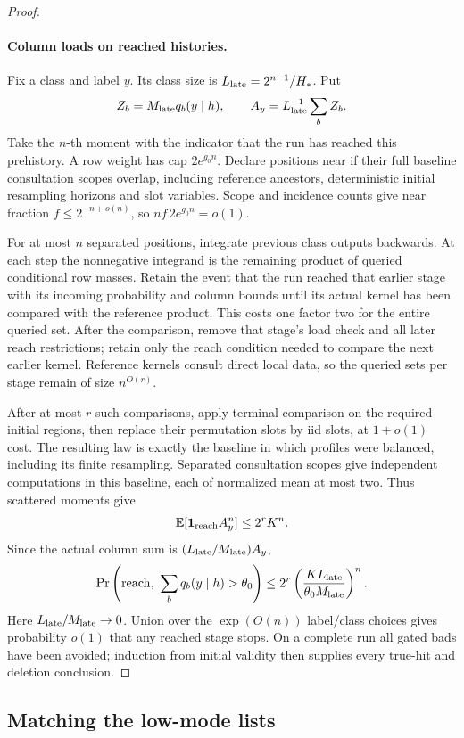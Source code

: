 \begin{proof}
\paragraph{Column loads on reached histories.}
Fix a class and label \(y\). Its class size is
\(L_{\rm late}=2^{n-1}/H_*\). Put
\[
 Z_b=M_{\rm late}q_b(y\mid h),\qquad
 A_y=L_{\rm late}^{-1}\sum_b Z_b.
\]
Take the \(n\)-th moment with the indicator that the run has reached
this prehistory. A row weight has cap \(2e^{g_0n}\). Declare positions
near if their full baseline consultation scopes overlap, including
reference ancestors, deterministic initial resampling horizons and
slot variables. Scope and incidence counts give near fraction
\(f\le2^{-n+o(n)}\), so
\(nf\,2e^{g_0n}=o(1)\).

For at most \(n\) separated positions, integrate previous class
outputs backwards. At each step the nonnegative integrand is the
remaining product of queried conditional row masses. Retain the event
that the run reached that earlier stage with its incoming probability
and column bounds until its actual kernel has been compared with the
reference product. This costs one factor two for the entire queried
set. After the comparison, remove that stage's load check and all
later reach restrictions; retain only the reach condition needed to
compare the next earlier kernel. Reference kernels consult direct
local data, so the queried sets per stage remain of size \(n^{O(r)}\).

After at most \(r\) such comparisons, apply terminal comparison on
the required initial regions, then replace their permutation slots by
iid slots, at \(1+o(1)\) cost. The resulting law is exactly the
baseline in which profiles were balanced, including its finite
resampling. Separated consultation scopes give independent computations
in this baseline, each of normalized mean at most two. Thus scattered
moments give
\[
 \mathbb E[\mathbf1_{\rm reach}A_y^n]\le2^r K^n.
\]
Since the actual column sum is \((L_{\rm late}/M_{\rm late})A_y\),
\[
 \Pr\left(\mathrm{reach},\ \sum_bq_b(y\mid h)>\theta_0\right)
 \le2^r\left(\frac{K L_{\rm late}}{\theta_0M_{\rm late}}\right)^n.
\]
Here \(L_{\rm late}/M_{\rm late}\to0\). Union over the
\(\exp(O(n))\) label/class choices gives probability \(o(1)\)
that any reached stage stops. On a complete run all gated bads have
been avoided; induction from initial validity then supplies every
true-hit and deletion conclusion.
\end{proof}

\subsection{Matching the low-mode lists}
\label{sec:matching-the-low-mode-lists}

